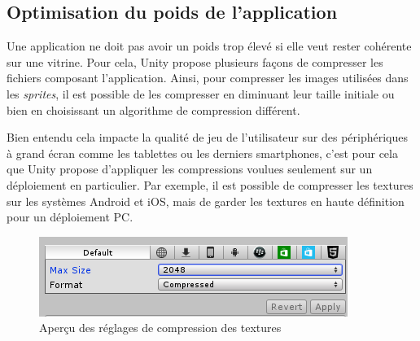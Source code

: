 \subsection{Optimisation du poids de l'application}

Une application ne doit pas avoir un poids trop élevé si elle veut rester cohérente sur une vitrine.  Pour cela, Unity propose plusieurs façons de compresser les fichiers composant l'application. Ainsi, pour compresser les images utilisées dans les \textit{sprites}, il est possible de les compresser en diminuant leur taille initiale ou bien en choisissant un algorithme de compression différent.

Bien entendu cela impacte la qualité de jeu de l'utilisateur sur des périphériques à grand écran comme les tablettes ou les derniers smartphones, c'est pour cela que Unity propose d'appliquer les compressions voulues seulement sur un déploiement en particulier. Par exemple, il est possible de compresser les textures sur les systèmes Android et iOS, mais de garder les textures en haute définition pour un déploiement PC.


\begin{figure}[H]\centering
  \includegraphics[scale=1]{./img/optimisation_poids.png}
  \caption{Aperçu des réglages de compression des textures}
  \label{optimisation_poids}
\end{figure}

